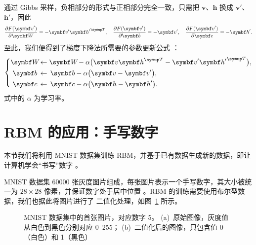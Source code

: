 通过 Gibbs 采样，负相部分的形式与正相部分完全一致，只需把 $\bm{v}$、$\bm{h}$ 换成 $\bm{v}'$、
$\bm{h}'$，因此
\begin{equation}
  \pdv{F(\bm{v}')}{\bm{W}} = - \bm{v}' {\bm{h}'}^\trans \qc
  \pdv{F(\bm{v}')}{\bm{b}} = - \bm{v}' \qc
  \pdv{F(\bm{v}')}{\bm{c}} = - \bm{h}'.
\end{equation}
至此，我们便得到了梯度下降法所需要的参数更新公式 \cite{zhouzhihua,hinton2012practical}：
\begin{equation}
  \left\{
  \begin{aligned}
    \bm{W} \! &\gets \bm{W} \! - \alpha \qty\big(\bm{v} \bm{h}^\trans
                                                 - \bm{v}' {\bm{h}'}^\trans), \\
    \bm{b} \, &\gets \, \bm{b} - \alpha \qty\big(\bm{v} - \bm{v}'), \\
    \bm{c} \, &\gets \, \bm{c} - \alpha \qty\big(\bm{h} - \bm{h}').
  \end{aligned}
  \right.
\end{equation}
式中的 $\alpha$ 为学习率。

\section{RBM 的应用：手写数字}
\label{sec:rbm-mnist}

本节我们将利用 MNIST 数据集训练 RBM，并基于已有数据生成新的数据，即让计算机学会“书写”数字
\cite{rbmonline,lyy1994rbm}。

MNIST 数据集 \num{60000} 张灰度图片组成，每张图片表示一个手写数字，其大小被统一为 $28 \times 28$
像素，并保证数字处于居中位置 \cite{mnist}。RBM 的训练需要使用布尔型数据，我们也据此将图片进行了
二值化处理，如图~\ref{fig:mnist-image} 所示。

\begin{figure}[htb]
  \centering
  \begin{subfigure}[b]{0.35\textwidth}
    \centering
    \caption{}
  \end{subfigure}
  \begin{subfigure}[b]{0.35\textwidth}
    \centering
    \caption{}
  \end{subfigure}
  \caption{MNIST 数据集中的首张图片，对应数字 5。
    (a)~原始图像，灰度值从白色到黑色分别对应 0--255；
    (b)~二值化后的图像，只包含值 0（白色）和 1（黑色）}
  \label{fig:mnist-image}
\end{figure}

